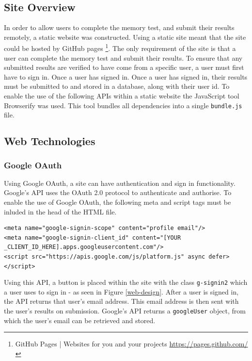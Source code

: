 \documentclass[ %
                    author={Elis Jones},
                supervisor={Dr. Kirsten Cater},
                    degree={BSc},
                     title={The Effect of Presentation Medium on Spatial Cognition},
                  subtitle={in the Virtual Environment},
                      year={2018} ]{dissertation}
\begin{document}
\subsection{Site Overview}
In order to allow users to complete the memory test, and submit their results remotely, a static website was constructed. Using a static site meant that the site could be hosted by GitHub pages \footnote{GitHub Pages | Websites for you and your projects \url{https://pages.github.com/}}. The only requirement of the site is that a user can complete the memory test and submit their results. To ensure that any submitted results are verified to have come from a specific user, a user must first have to sign in. Once a user has signed in. Once a user has signed in, their results must be submitted to and stored in a database, along with their user id. To enable the use of the following APIs within a static website the JavaScript tool Browserify was used. This tool bundles all dependencies into a single \lstinline{bundle.js} file.  

\subsection{Web Technologies}

\subsubsection{Google OAuth}

Using Google OAuth, a site can have authentication and sign in functionality. Google's API uses the OAuth 2.0 protocol to authenticate and authorise. To enable the use of Google OAuth, the following meta and script tags must be inluded in the head of the HTML file. 

\noindent \begin{minipage}{\textwidth}
\centering
\begin{lstlisting}
<meta name="google-signin-scope" content="profile email"/>
<meta name="google-signin-client_id" content="[YOUR _CLIENT_ID_HERE].apps.googleusercontent.com"/>
<script src="https://apis.google.com/js/platform.js" async defer></script>
\end{lstlisting}
\end{minipage}

Using this API, a button is placed within the site with the class \lstinline{g-signin2} which a user uses to sign in - as seen in Figure \ref{web-design}. After a user is signed in, the API returns that user's email address. This email address is then sent with the user's results on submission. Google's API returns a \lstinline{googleUser} object, from which the user's email can be retrieved and stored. 
\end{document}
